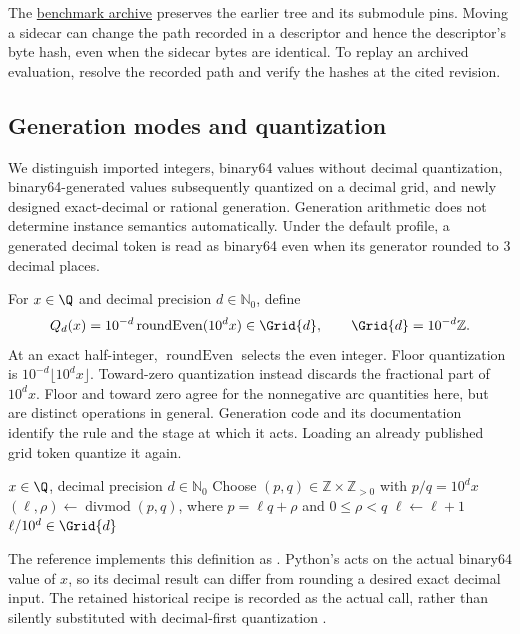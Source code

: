The \href{https://github.com/ANR-MAMUT/MAMUT-routing-archive-2026-11}{benchmark archive} preserves the earlier tree and its submodule pins. Moving a sidecar can change the path recorded in a descriptor and hence the descriptor's byte hash, even when the sidecar bytes are identical. To replay an archived evaluation, resolve the recorded path and verify the hashes at the cited revision.

\subsection{Generation modes and quantization}
We distinguish imported integers, binary64 values without decimal quantization, binary64-generated values subsequently quantized on a decimal grid, and newly designed exact-decimal or rational generation. Generation arithmetic does not determine instance semantics automatically. Under the default profile, a generated decimal token is read as binary64 even when its generator rounded to 3 decimal places.

For $x\in\Q$ and decimal precision $d\in\mathbb{N}_0$, define
\begin{equation}\label{eq:decimal-quantization}
Q_d(x)=10^{-d}\operatorname{roundEven}(10^d x)\in\Grid{d},\qquad \Grid{d}=10^{-d}\mathbb{Z}.
\end{equation}
At an exact half-integer, $\operatorname{roundEven}$ selects the even integer. Floor quantization is $10^{-d}\lfloor10^d x\rfloor$. Toward-zero quantization instead discards the fractional part of $10^d x$. Floor and toward zero agree for the nonnegative arc quantities here, but are distinct operations in general. Generation code and its documentation \must{} identify the rule and the stage at which it acts. Loading an already published grid token \mustnot{} quantize it again.

\begin{algorithm}[htbp]
\caption{Exact decimal-grid quantization}\label{alg:quantize}
\begin{algorithmic}[1]
\Require $x\in\Q$, decimal precision $d\in\mathbb{N}_0$
\State Choose $(p,q)\in\mathbb{Z}\times\mathbb{Z}_{>0}$ with $p/q=10^d x$
\State $(\ell,\rho)\gets\operatorname{divmod}(p,q)$, where $p=\ell q+\rho$ and $0\leq\rho<q$
\State $\ell\gets\ell+1$
\EndIf
\State \Return $\ell/10^d\in\Grid{d}$
\end{algorithmic}
\end{algorithm}

The reference implements this definition as . Python's  acts on the actual binary64 value of $x$, so its decimal result can differ from rounding a desired exact decimal input. The retained historical recipe is recorded as the actual call, rather than silently substituted with decimal-first quantization \autocite{pythonRound2026}.


